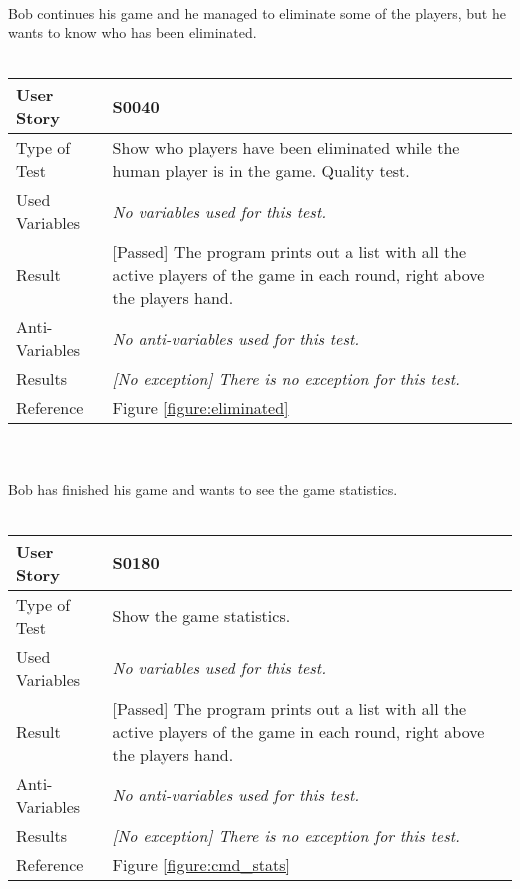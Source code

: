 \vspace{0.2cm}\\
Bob continues his game and he managed to eliminate some of the players, but he wants to know who has been eliminated.\\
\vspace{0.2cm}\\  
\begin{tabular}{l | p{12cm}}
User Story & \textbf{S0040}\\ \hline
Type of Test & Show who players have been eliminated while the human player is in the game. Quality test.\\ \hline
Used Variables & \textit{No variables used for this test.}\\ \hline
Result & [Passed] The program prints out a list with all the active players of the game in each round, right above the players hand.\\ \hline
Anti-Variables & \textit{No anti-variables used for this test.}\\ \hline
Results & \textit{[No exception] There is no exception for this test.}\\ \hline
Reference & Figure \ref{figure:eliminated} \\ \hline
\end{tabular}\\
\vspace{0.2cm}\\
Bob has finished his game and wants to see the game statistics.\\
\vspace{0.2cm}\\  
\begin{tabular}{l | p{12cm}}
User Story & \textbf{S0180}\\ \hline
Type of Test & Show the game statistics.\\ \hline
Used Variables & \textit{No variables used for this test.}\\ \hline
Result & [Passed] The program prints out a list with all the active players of the game in each round, right above the players hand.\\ \hline
Anti-Variables & \textit{No anti-variables used for this test.}\\ \hline
Results & \textit{[No exception] There is no exception for this test.}\\ \hline
Reference & Figure \ref{figure:cmd_stats} \\ \hline
\end{tabular}\\
